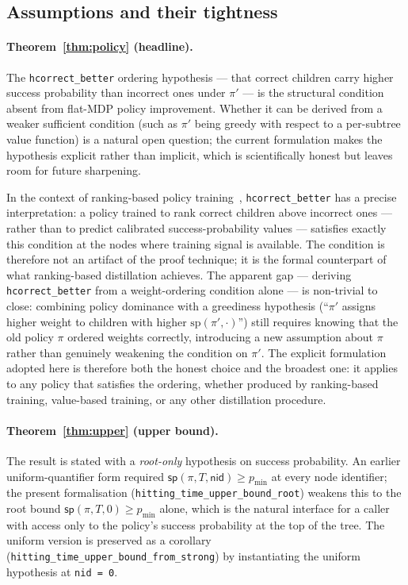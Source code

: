 \documentclass[reqno,11pt]{amsart}
\newcommand{\sP}{\mathsf{sp}}
\newcommand{\nid}{\mathsf{nid}}
\newcommand{\lean}[1]{\textup{\texttt{\small #1}}}
\theoremstyle{plain}
\theoremstyle{definition}
\theoremstyle{remark}
\begin{document}
\subsection{Assumptions and their tightness}

\paragraph{Theorem~\ref{thm:policy} (headline).} The \texttt{hcorrect\_better} ordering hypothesis --- that correct children carry higher success probability than incorrect ones under $\pi'$ --- is the structural condition absent from flat-MDP policy improvement. Whether it can be derived from a weaker sufficient condition (such as $\pi'$ being greedy with respect to a per-subtree value function) is a natural open question; the current formulation makes the hypothesis explicit rather than implicit, which is scientifically honest but leaves room for future sharpening.

In the context of ranking-based policy training~\citep{ChrestienEtAl2023}, \texttt{hcorrect\_better} has a precise interpretation: a policy trained to rank correct children above incorrect ones --- rather than to predict calibrated success-probability values --- satisfies exactly this condition at the nodes where training signal is available. The condition is therefore not an artifact of the proof technique; it is the formal counterpart of what ranking-based distillation achieves. The apparent gap --- deriving \texttt{hcorrect\_better} from a weight-ordering condition alone --- is non-trivial to close: combining policy dominance with a greediness hypothesis (``$\pi'$ assigns higher weight to children with higher $\mathrm{sp}(\pi', \cdot)$'') still requires knowing that the old policy $\pi$ ordered weights correctly, introducing a new assumption about $\pi$ rather than genuinely weakening the condition on $\pi'$. The explicit formulation adopted here is therefore both the honest choice and the broadest one: it applies to any policy that satisfies the ordering, whether produced by ranking-based training, value-based training, or any other distillation procedure.

\paragraph{Theorem~\ref{thm:upper} (upper bound).} The result is stated with a \emph{root-only} hypothesis on success probability. An earlier uniform-quantifier form required $\sP(\pi, T, \nid) \ge p_{\min}$ at every node identifier; the present formalisation (\lean{hitting\_time\_upper\_bound\_root}) weakens this to the root bound $\sP(\pi, T, 0) \ge p_{\min}$ alone, which is the natural interface for a caller with access only to the policy's success probability at the top of the tree. The uniform version is preserved as a corollary (\lean{hitting\_time\_upper\_bound\_from\_strong}) by instantiating the uniform hypothesis at \texttt{nid~=~0}.
\end{document}
